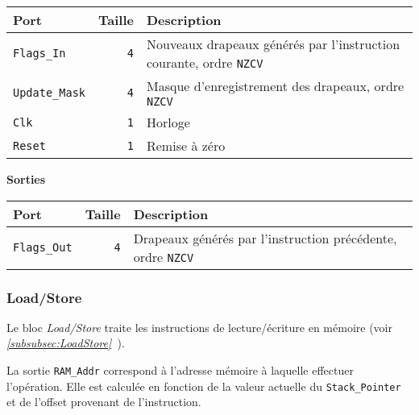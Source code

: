 \documentclass{article}
\begin{document}
    \begin{tabular}{|l|r|l|}
        \hline
        \textbf{Port}        & \textbf{Taille} & \textbf{Description}                                                      \\
        \hline

        \texttt{Flags\_In}    & \texttt{4}      & Nouveaux drapeaux générés par l'instruction courante, ordre \texttt{NZCV} \\
        \hline
        \texttt{Update\_Mask} & \texttt{4}      & Masque d'enregistrement des drapeaux, ordre \texttt{NZCV}                 \\
        \hline
        \texttt{Clk}         & \texttt{1}      & Horloge                                                                   \\
        \hline
        \texttt{Reset}       & \texttt{1}      & Remise à zéro                                                             \\


        \hline
    \end{tabular}

    \vspace{1em}
    \textbf{Sorties}\\

    \begin{tabular}{|l|r|l|}
        \hline
        \textbf{Port}        & \textbf{Taille} & \textbf{Description}                                               \\
        \hline

        \texttt{Flags\_Out} & \texttt{4}      & Drapeaux générés par l'instruction précédente, ordre \texttt{NZCV} \\

        \hline
    \end{tabular}

    \subsubsection{Load/Store}
    \label{sec:LoadStore}

    Le bloc \textit{Load/Store} traite les instructions de lecture/écriture en mémoire (voir \textit{\ref{subsubsec:LoadStore}~}).

    La sortie \texttt{RAM\_Addr} correspond à l'adresse mémoire à laquelle effectuer l'opération.
    Elle est calculée en fonction de la valeur actuelle du \texttt{Stack\_Pointer} et de l'offset provenant de l'instruction.
\end{document}
